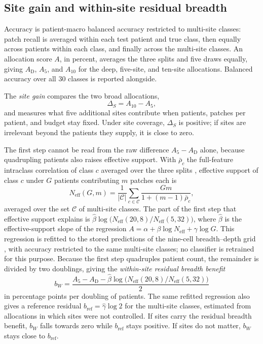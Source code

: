 \documentclass[11pt]{article}
\newcommand{\Neff}{N_{\mathrm{eff}}}
\begin{document}
\subsection{Site gain and within-site residual breadth}
\label{sec:contrasts}
Accuracy is patient-macro balanced accuracy restricted to multi-site classes: patch recall is averaged within each test patient and true class, then equally across patients within each class, and finally across the multi-site classes. An allocation score $A$, in percent, averages the three splits and five draws equally, giving $A_{\mathrm D}$, $A_5$, and $A_{10}$ for the deep, five-site, and ten-site allocations. Balanced accuracy over all 30 classes is reported alongside.

The \emph{site gain} compares the two broad allocations,
\begin{equation}
 \Delta_S=A_{10}-A_{5},
 \label{eq:site-gain}
\end{equation}
\noindent and measures what five additional sites contribute when patients, patches per patient, and budget stay fixed. Under site coverage, $\Delta_S$ is positive; if sites are irrelevant beyond the patients they supply, it is close to zero.

The first step cannot be read from the raw difference $A_5-A_{\mathrm D}$ alone, because quadrupling patients also raises effective support. With $\bar\rho_c$ the full-feature intraclass correlation of class $c$ averaged over the three splits \citep{queisler2026multidirectionalRedundancy}, effective support of class $c$ under $G$ patients contributing $m$ patches each is
\begin{equation}
 \Neff(G,m)=\frac{1}{|\mathcal C|}\sum_{c\in\mathcal C}\frac{Gm}{1+(m-1)\bar\rho_c},
 \label{eq:neff}
\end{equation}
\noindent averaged over the set $\mathcal C$ of multi-site classes. The part of the first step that effective support explains is $\hat\beta\log\bigl(\Neff(20,8)/\Neff(5,32)\bigr)$, where $\hat\beta$ is the effective-support slope of the regression $A=\alpha+\beta\log\Neff+\gamma\log G$. This regression is refitted to the stored predictions of the nine-cell breadth--depth grid \citep{queisler2026effectiveSupport}, with accuracy restricted to the same multi-site classes; no classifier is retrained for this purpose. Because the first step quadruples patient count, the remainder is divided by two doublings, giving the \emph{within-site residual breadth benefit}
\begin{equation}
 b_W=\frac{A_5-A_{\mathrm D}-\hat\beta\log\bigl(\Neff(20,8)/\Neff(5,32)\bigr)}{2}
 \label{eq:within-site}
\end{equation}
\noindent in percentage points per doubling of patients. The same refitted regression also gives a reference residual $b_{\mathrm{ref}}=\hat\gamma\log 2$ for the multi-site classes, estimated from allocations in which sites were not controlled. If sites carry the residual breadth benefit, $b_W$ falls towards zero while $b_{\mathrm{ref}}$ stays positive. If sites do not matter, $b_W$ stays close to $b_{\mathrm{ref}}$.
\end{document}
